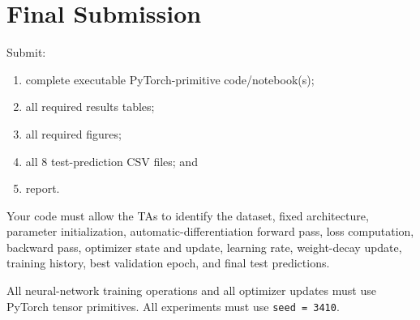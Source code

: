 \documentclass[11pt]{article}
\begin{document}
\section{Final Submission}
Submit:
\begin{enumerate}
    \item complete executable PyTorch-primitive code/notebook(s);
    \item all required results tables;
    \item all required figures;
    \item all 8 test-prediction CSV files; and
    \item report.
\end{enumerate}

Your code must allow the TAs to identify the dataset, fixed architecture, parameter initialization, automatic-differentiation forward pass, loss computation, backward pass, optimizer state and update, learning rate, weight-decay update, training history, best validation epoch, and final test predictions.

All neural-network training operations and all optimizer updates must use PyTorch tensor primitives. All experiments must use \texttt{seed = 3410}.
\end{document}
